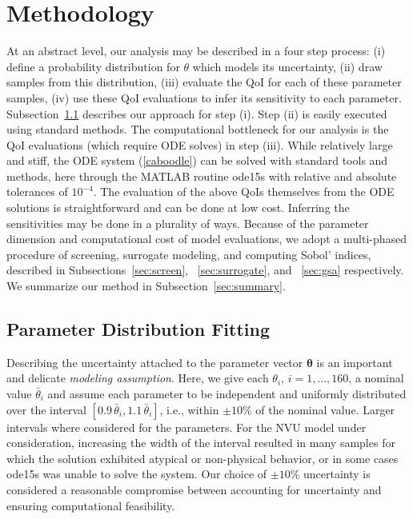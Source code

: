 \section{Methodology}\label{sec:meth}

At an abstract level, our analysis may be described in a four step process: (i) define a probability distribution for $\theta$ which models its uncertainty, (ii) draw samples from this distribution, (iii) evaluate the QoI for each of these parameter samples, (iv) use these QoI evaluations to infer its sensitivity to each parameter. Subsection~\ref{sec:param_dist_fit} describes our approach for step (i). Step (ii) is easily executed using standard methods. The computational bottleneck for our analysis is the QoI evaluations (which require ODE solves) in step (iii). While relatively large and stiff, the ODE system (\ref{caboodle}) can be  solved with standard tools and methods, here through the MATLAB routine ode15s with relative and absolute tolerances of $10^{-4}$. The evaluation of the above QoIs themselves from the ODE solutions is straightforward and can be done at low cost. Inferring the sensitivities may be done in a plurality of ways. Because of the parameter dimension and computational cost of model evaluations, we adopt a multi-phased procedure of screening, surrogate modeling, and computing Sobol' indices, described in Subsections~\ref{sec:screen}, ~\ref{sec:surrogate}, and ~\ref{sec:gsa} respectively. We summarize our method in Subsection~\ref{sec:summary}.

\subsection{Parameter Distribution Fitting}
\label{sec:param_dist_fit}

Describing the uncertainty attached to the parameter vector $\boldsymbol{\theta}$ is an important and delicate {\sl modeling assumption}. Here, we give each $\theta_i$, $i=1,\dots, 160$, a nominal value $\bar \theta_i$ and assume each parameter to be independent and uniformly distributed over the interval $[0.9\, \bar\theta_i, 1.1 \,\bar\theta_i]$, i.e., within $\pm 10\%$ of the nominal value. Larger intervals where considered for the parameters. For the NVU model under consideration, increasing the width of the interval resulted in many samples for which the solution exhibited atypical or non-physical behavior, or in some cases ode15s was unable to solve the system. Our choice of $\pm 10\%$ uncertainty is considered a reasonable compromise between accounting for uncertainty and ensuring computational feasibility. 
	
